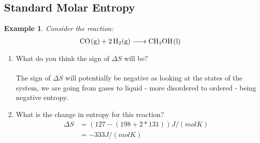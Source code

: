 \documentclass{article}  %
\newtheorem{exmp}{Example}
\begin{document}
\subsection*{Standard Molar Entropy}
\begin{exmp}
    Consider the reaction:
    \begin{equation*}
        \begin{aligned}
            \ce{CO_(g) + 2H2_(g) -> CH3OH_(l)}
        \end{aligned}
    \end{equation*}
\end{exmp}
\begin{enumerate}
    \item What do you think the sign of $\Delta S$ will be? \\
    \\
    The sign of $\Delta S$ will potentially be negative as looking at the states of the system, we are going from gases to liquid - more disordered to ordered - being negative entropy.
    \item What is the change in entropy for this reaction? 
        \begin{equation*}
            \begin{aligned}
                \Delta S &= (127 - (198+2*131)) J/(mol K)\\
                &= -333 J/(mol K)
            \end{aligned}
        \end{equation*}
\end{enumerate}
\end{document}
